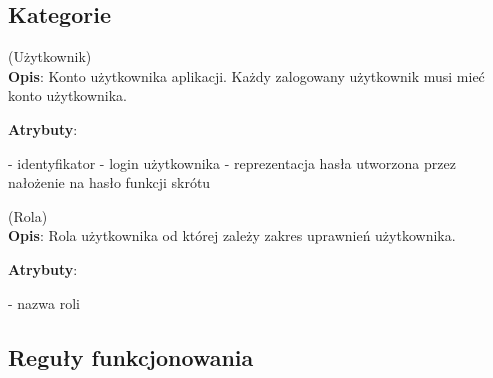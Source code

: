 \subsection{Kategorie}\label{subsec:database:categories}

\begin{enumerate}[label={\textbf{KAT/\protect\threedigits{\theenumi}}}, wide, labelwidth=!, labelindent=0pt, labelsep=0pt, series=reqs]
    \setlength\itemsep{1.75em}
    \label{kat:User} (Użytkownik)\\
    \indent\textbf{Opis}: Konto użytkownika aplikacji. Każdy zalogowany użytkownik musi mieć konto użytkownika.
    \par
    \textbf{Atrybuty}:
    \begin{itemize}[series=atr, wide, align=left, leftmargin=190pt]
        \label{kat:User:id}- identyfikator
        \label{kat:User:login}- login użytkownika
        \label{kat:User:passwordHash}- reprezentacja hasła utworzona przez nałożenie na hasło funkcji skrótu
    \end{itemize}

    \label{kat:Authority} (Rola)\\
    \indent\textbf{Opis}: Rola użytkownika od której zależy zakres uprawnień użytkownika.
    \par
    \textbf{Atrybuty}:
    \begin{itemize}[series=atr, wide, align=left, leftmargin=190pt]
        \label{kat:Authority:name}- nazwa roli
    \end{itemize}
\end{enumerate}

\subsection{Reguły funkcjonowania}\label{subsec:database:functionalRules}

